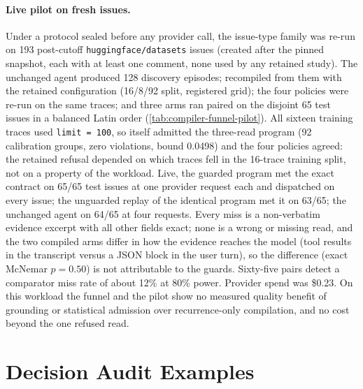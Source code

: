 \paragraph{Live pilot on fresh issues.}
Under a protocol sealed before any provider call, the issue-type family was re-run on 193
post-cutoff \texttt{huggingface/datasets} issues (created after the pinned snapshot, each with
at least one comment, none used by any retained study). The unchanged agent produced 128
discovery episodes; \method{} recompiled from them with the retained configuration
(16/8/92 split, registered grid); the four policies were re-run on the same traces; and three
arms ran paired on the disjoint 65 test issues in a balanced Latin order
(\cref{tab:compiler-funnel-pilot}). All sixteen training traces used \texttt{limit = 100}, so
\method{} itself admitted the three-read program (92 calibration groups, zero violations, bound
0.0498) and the four policies agreed: the retained refusal depended on which traces fell in the
16-trace training split, not on a property of the workload. Live, the guarded program met the
exact contract on 65/65 test issues at one provider request each and dispatched on every
issue; the unguarded replay of the identical program met it on 63/65; the unchanged agent on
64/65 at four requests. Every miss is a non-verbatim evidence excerpt with all other fields
exact; none is a wrong or missing read, and the two compiled arms differ in how the evidence
reaches the model (tool results in the transcript versus a JSON block in the user turn), so the
difference (exact McNemar $p=0.50$) is not attributable to the guards. Sixty-five pairs detect a
comparator miss rate of about 12\% at 80\% power. Provider spend was \$0.23. On this workload
the funnel and the pilot show no measured quality benefit of grounding or statistical admission
over recurrence-only compilation, and no cost beyond the one refused read.

\begin{table}[!h]
  \centering
  \caption{Live pilot on 65 fresh post-cutoff issues, three arms paired per issue; per-issue
  means. ``Exact'' is the exact source-grounded contract.}
  \label{tab:compiler-funnel-pilot}
  \small
  
\end{table}

\section{Decision Audit Examples}
\label{app:decision-audit}

